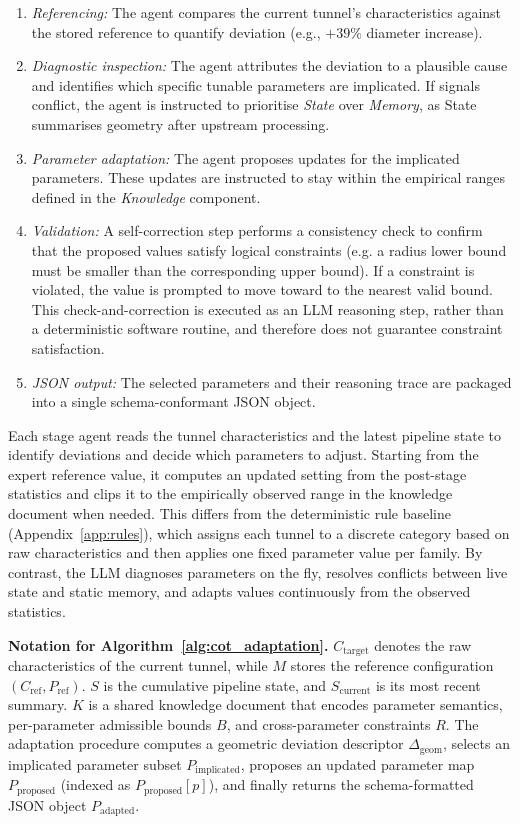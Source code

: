 \documentclass[a4paper,fleqn]{cas-dc}
\begin{document}
{\begin{enumerate}
    \item \emph{Referencing:} The agent compares the current tunnel's characteristics against the stored reference to quantify deviation (e.g., $+39\%$ diameter increase).
    \item \emph{Diagnostic inspection:} The agent attributes the deviation to a plausible cause and identifies which specific tunable parameters are implicated. If signals conflict, the agent is instructed to prioritise \emph{State} over \emph{Memory}, as State summarises geometry after upstream processing.
    \item \emph{Parameter adaptation:} The agent proposes updates for the implicated parameters. These updates are instructed to stay within the empirical ranges defined in the \emph{Knowledge} component.
    \item \emph{Validation:} A self-correction step performs a consistency check to confirm that the proposed values satisfy logical constraints (e.g. a radius lower bound must be smaller than the corresponding upper bound). If a constraint is violated, the value is prompted to move toward to the nearest valid bound. This check-and-correction is executed as an LLM reasoning step, rather than a deterministic software routine, and therefore does not guarantee constraint satisfaction.
    \item \emph{JSON output:} The selected parameters and their reasoning trace are packaged into a single schema-conformant JSON object.
\end{enumerate}

Each stage agent reads the tunnel characteristics and the latest pipeline state to identify deviations and decide which parameters to adjust. Starting from the expert reference value, it computes an updated setting from the post-stage statistics and clips it to the empirically observed range in the knowledge document when needed. This differs from the deterministic rule baseline (Appendix~\ref{app:rules}), which assigns each tunnel to a discrete category based on raw characteristics and then applies one fixed parameter value per family. By contrast, the LLM diagnoses parameters on the fly, resolves conflicts between live state and static memory, and adapts values continuously from the observed statistics.

\noindent\textbf{Notation for Algorithm~\ref{alg:cot_adaptation}.} $C_{\text{target}}$ denotes the raw characteristics of the current tunnel, while $M$ stores the reference configuration $(C_{\text{ref}}, P_{\text{ref}})$. $S$ is the cumulative pipeline state, and $S_{\text{current}}$ is its most recent summary. $K$ is a shared knowledge document that encodes parameter semantics, per-parameter admissible bounds $B$, and cross-parameter constraints $R$. The adaptation procedure computes a geometric deviation descriptor $\Delta_{\text{geom}}$, selects an implicated parameter subset $P_{\text{implicated}}$, proposes an updated parameter map $P_{\text{proposed}}$ (indexed as $P_{\text{proposed}}[p]$), and finally returns the schema-formatted JSON object $P_{\text{adapted}}$.

}
\end{document}
